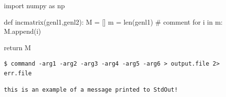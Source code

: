 
\begin{python}
import numpy as np
    
def incmatrix(genl1,genl2):
    M = []
    m = len(genl1)  # comment 
    for i in m:
        M.append(i)
    
    return M
\end{python}

\begin{lstlisting}
$ command -arg1 -arg2 -arg3 -arg4 -arg5 -arg6 > output.file 2> err.file
\end{lstlisting}

\begin{lstlisting}[columns=flexible]
this is an example of a message printed to StdOut!
\end{lstlisting}


